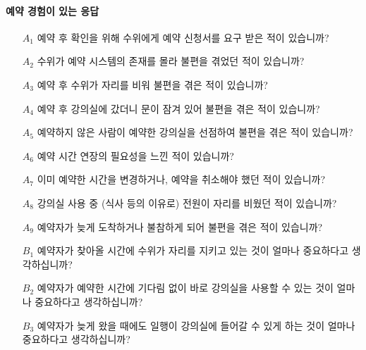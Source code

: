 \documentclass[11pt,a4paper]{article}
\begin{document}
\paragraph{예약 경험이 있는 응답}
\begin{itemize}
\item[$A_1$] 예약 후 확인을 위해 수위에게 예약 신청서를 요구 받은 적이 있습니까?
\item[$A_2$] 수위가 예약 시스템의 존재를 몰라 불편을 겪었던 적이 있습니까?
\item[$A_3$] 예약 후 수위가 자리를 비워 불편을 겪은 적이 있습니까?
\item[$A_4$] 예약 후 강의실에 갔더니 문이 잠겨 있어 불편을 겪은 적이 있습니까?
\item[$A_5$] 예약하지 않은 사람이 예약한 강의실을 선점하여 불편을 겪은 적이 있습니까?
\item[$A_6$] 예약 시간 연장의 필요성을 느낀 적이 있습니까?
\item[$A_7$] 이미 예약한 시간을 변경하거나, 예약을 취소해야 했던 적이 있습니까?
\item[$A_8$] 강의실 사용 중 (식사 등의 이유로) 전원이 자리를 비웠던 적이 있습니까?
\item[$A_9$] 예약자가 늦게 도착하거나 불참하게 되어 불편을 겪은 적이 있습니까?
\item[$B_1$] 예약자가 찾아올 시간에 수위가 자리를 지키고 있는 것이 얼마나 중요하다고 생각하십니까?
\item[$B_2$] 예약자가 예약한 시간에 기다림 없이 바로 강의실을 사용할 수 있는 것이 얼마나 중요하다고 생각하십니까?
\item[$B_3$] 예약자가 늦게 왔을 때에도 일행이 강의실에 들어갈 수 있게 하는 것이 얼마나 중요하다고 생각하십니까?
\end{itemize}
\end{document}
